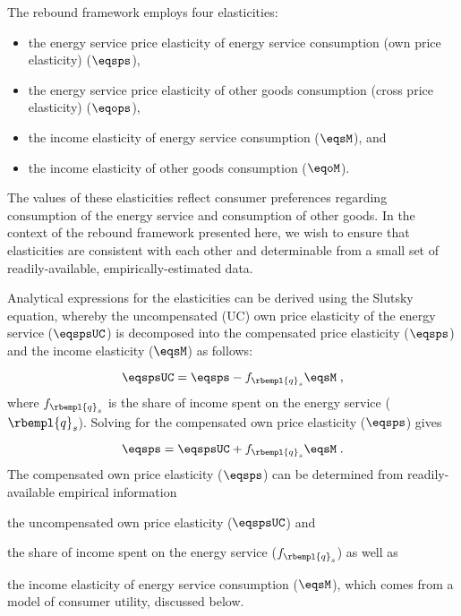 

The rebound framework employs four elasticities:
%
\begin{itemize}

  \item the energy service price elasticity of energy service consumption (own price elasticity) ($\eqsps$),

  \item the energy service price elasticity of other goods consumption (cross price elasticity) ($\eqops$), 
  
  \item the income elasticity of energy service consumption ($\eqsM$), and 
  
  \item the income elasticity of other goods consumption ($\eqoM$).

\end{itemize}
%
The values of these elasticities reflect consumer preferences regarding 
consumption of the energy service and consumption of other goods.
In the context of the rebound framework presented here, 
we wish to ensure that elasticities are consistent with each other
and determinable from a small set 
of readily-available, empirically-estimated data. 

Analytical expressions for the elasticities can be derived using the Slutsky equation, 
whereby the uncompensated (UC) own price elasticity 
of the energy service ($\eqspsUC$) 
is decomposed into the compensated price elasticity ($\eqsps$) and
the income elasticity ($\eqsM$) as follows:

\begin{equation}
  \eqspsUC = \eqsps - f_{\rbempl{q}_s} \eqsM \; ,
\end{equation}
%
where $f_{\rbempl{q}_s}$ is the share of income spent 
on the energy service ($\rbempl{q}_s$). 
Solving for the compensated own price elasticity ($\eqsps$) gives

\begin{equation} \label{eq:eqsps}
  \eqsps = \eqspsUC + f_{\rbempl{q}_s} \eqsM \; .
\end{equation}
%
The compensated own price elasticity ($\eqsps$)
can be determined from readily-available empirical information
%
\begin{enumerate*}[label={(\alph*)}]
	
  \item the uncompensated own price elasticity ($\eqspsUC$) and 
  
  \item the share of income spent on the energy service ($f_{\rbempl{q}_s}$)
        as well as
        
  \item the income elasticity of energy service consumption ($\eqsM$), which 
        comes from a model of consumer utility, discussed below.
    
\end{enumerate*}

